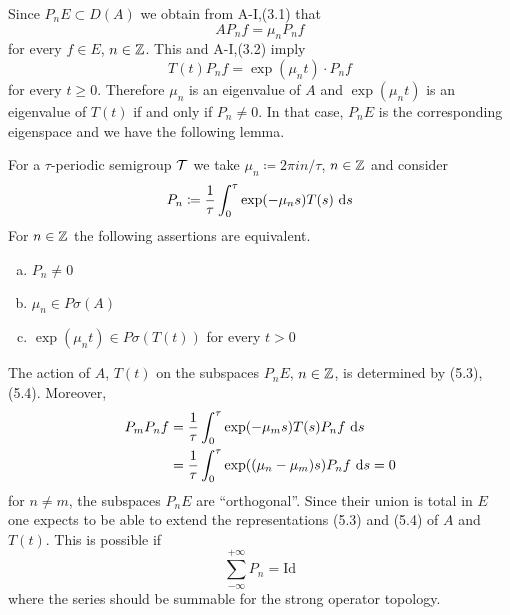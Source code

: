 Since $P_{n}E \subset D(A)$ we obtain from A-I,(3.1) that
\begin{equation}\label{eq:a3-5.3}
AP_{n}f = \mu_{n}P_{n}f
\end{equation}
for every $f \in E$, $n \in \mathbb{Z}$.
This and A-I,(3.2) imply
\begin{equation}\label{eq:a3-5.4}
T(t)P_{n}f = \exp(\mu_{n}t) \cdot P_{n}f
\end{equation}
for every $t \geq 0$.
Therefore $\mu_{n}$ is an eigenvalue of $A$ and $\exp(\mu_{n}t)$ is an eigenvalue of $T(t)$ if and only if $P_{n} \neq 0$.
In that case, $P_{n}E$ is the corresponding eigenspace and we have the following lemma.
\begin{lemma}\label{lem:a3-5.3}
For a $\tau$-periodic semigroup $\mathcal{T}$ we take $\mu_{n} \coloneqq 2\pi in/\tau$, $n \in \mathbb{Z}$ and consider
\[
P_{n} \coloneqq \frac{1}{\tau}\int_{0}^{\tau} \exp(-\mu_{n}s)T(s) \, \mathop{}\!\mathrm{d}{s}
\]
For $n \in \mathbb{Z}$ the following assertions are equivalent.
\begin{enumerate}[(a)]
\item 
$P_{n} \neq 0$

\item 
$\mu_{n} \in P\sigma(A)$

\item 
$\exp(\mu_{n}t) \in P\sigma(T(t))$ for every $t > 0$

\end{enumerate}
\end{lemma}
The action of $A$, \resp $T(t)$ on the subspaces $P_{n}E$, $n \in \mathbb{Z}$, is determined by (5.3), \resp (5.4).
Moreover,
\begin{align*}
P_{m}P_{n}f &=  \frac{1}{\tau}\int_{0}^{\tau} \exp(-\mu_{m}s)T(s)P_{n}f \, \mathop{}\!\mathrm{d}{s} \\
&=  \frac{1}{\tau}\int_{0}^{\tau} \exp((\mu_{n}-\mu_{m})s)P_{n}f \, \mathop{}\!\mathrm{d}{s} = 0
\end{align*}
for $n \neq m$, \ie the subspaces $P_{n}E$ are \enquote{orthogonal}.
Since their union is total in $E$ one expects to be able to extend the representations (5.3) and (5.4) of $A$ and $T(t)$.
This is possible if
\[
\sum_{-\infty}^{+\infty} P_{n} = \text{Id}
\]
where the series should be summable for the strong operator topology.

